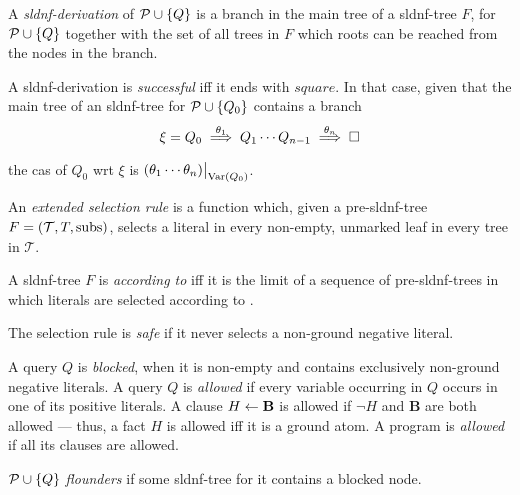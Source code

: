 \begin{dfn}
    A \emph{\gls{sldnf}-derivation} of \(\mathcal{P} \cup \lbrace Q \rbrace\) is a branch in the main tree of a \gls{sldnf}-tree \(F\), for \(\mathcal{P} \cup \lbrace Q \rbrace\) together with the set of all trees in \(F\) which roots can be reached from the nodes in the branch.

    A \gls{sldnf}-derivation is \emph{successful} iff it ends with \(square\).
    In that case, given that the main tree of an \gls{sldnf}-tree for \(\mathcal{P} \cup \lbrace Q_0 \rbrace\) contains a branch
    \begin{equation*}
        \xi = Q_0 \underset{}{\overset{\theta_1}{\implies}} Q_1 \dotsb Q_{n-1}
        \underset{}{\overset{\theta_n}{\implies}} \square
    \end{equation*}
    the \gls{cas} of \(Q_0\) wrt \(\xi\) is \(\restr{(\theta_1\dotsb\theta_n)}{\Var(Q_0)}\).
\end{dfn}

\begin{dfn}
    An \emph{extended selection rule} is a function  which, given a pre-\gls{sldnf}-tree \(F = (\mathcal{T},T,\operatorname{subs})\), selects a literal in every non-empty, unmarked leaf in every tree in \(\mathcal{T}\).

    A \gls{sldnf}-tree \(F\) is \emph{according to}  iff it is the limit of a sequence of pre-\gls{sldnf}-trees in which literals are selected according to .
    
    The selection rule  is \emph{safe} if it never selects a non-ground negative literal.
\end{dfn}

\begin{dfn}
    A query \(Q\) is \emph{blocked}, when it is non-empty and contains exclusively non-ground negative literals.
    A query \(Q\) is \emph{allowed} if every variable occurring in \(Q\) occurs in one of its positive literals.
    A clause \(H \leftarrow \mathbf{B}\) is allowed if \(\neg H\) and \(\mathbf{B}\) are both allowed --- thus, a fact \(H\) is allowed iff it is a ground atom.
    A program is \emph{allowed} if all its clauses are allowed.

    \(\mathcal{P} \cup \lbrace Q \rbrace\) \emph{flounders} if some \gls{sldnf}-tree for it contains a blocked node.
\end{dfn}

